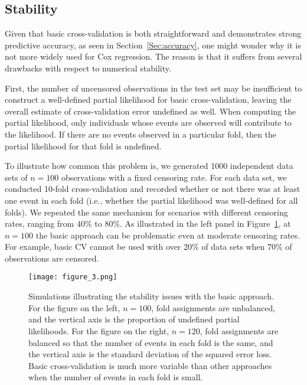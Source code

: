 \subsection {Stability}
\label{Sec:stability}

Given that basic cross-validation is both straightforward and demonstrates strong predictive accuracy, as seen in Section~\ref{Sec:accuracy}, one might wonder why it is not more widely used for Cox regression.  The reason is that it suffers from several drawbacks with respect to numerical stability.

First, the number of uncensored observations in the test set may be insufficient to construct a well-defined partial likelihood for basic cross-validation, leaving the overall estimate of cross-validation error undefined as well. When computing the partial likelihood, only individuals whose events are observed will contribute to the likelihood. If there are no events observed in a particular fold, then the partial likelihood for that fold is undefined. 

To illustrate how common this problem is, we generated 1000 independent data sets of $n = 100$ observations with a fixed censoring rate. For each data set, we conducted 10-fold cross-validation and recorded whether or not there was at least one event in each fold (i.e., whether the partial likelihood was well-defined for all folds). We repeated the same mechanism for scenarios with different censoring rates, ranging from $40\%$ to $80\%$. As illustrated in the left panel in Figure~\ref{Fig:stability}, at $n=100$ the basic approach can be problematic even at moderate censoring rates. For example, basic CV cannot be used with over 20\% of data sets when $70\%$ of observations are censored.

\begin{figure}[!htb]
  \centering
  \texttt{[image: figure\_3.png]}
  \caption{\label{Fig:stability} Simulations illustrating the stability issues with the basic approach. For the figure on the left, $n = 100$, fold assignments are unbalanced, and the vertical axis is the proportion of undefined partial likelihoods. For the figure on the right, $n = 120$, fold assignments are balanced so that the number of events in each fold is the same, and the vertical axis is the standard deviation of the squared error loss. Basic cross-validation is much more variable than other approaches when the number of events in each fold is small.}
\end{figure}

